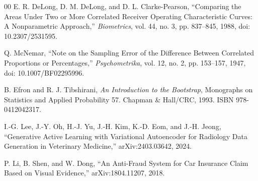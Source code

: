 \documentclass[journal]{IEEEtran}
\begin{document}
\begin{thebibliography}{00}
E. R. DeLong, D. M. DeLong, and D. L. Clarke-Pearson,
``Comparing the Areas Under Two or More Correlated Receiver Operating Characteristic Curves: A Nonparametric Approach,''
\textit{Biometrics}, vol. 44, no. 3, pp. 837--845, 1988,
doi: 10.2307/2531595.

Q. McNemar,
``Note on the Sampling Error of the Difference Between Correlated Proportions or Percentages,''
\textit{Psychometrika}, vol. 12, no. 2, pp. 153--157, 1947,
doi: 10.1007/BF02295996.

B. Efron and R. J. Tibshirani,
\textit{An Introduction to the Bootstrap}, Monographs on Statistics and Applied Probability 57.
Chapman \& Hall/CRC, 1993. ISBN 978-0412042317.

I.-G. Lee, J.-Y. Oh, H.-J. Yu, J.-H. Kim, K.-D. Eom, and J.-H. Jeong,
``Generative Active Learning with Variational Autoencoder for Radiology Data Generation in Veterinary Medicine,''
arXiv:2403.03642, 2024.

P. Li, B. Shen, and W. Dong,
``An Anti-Fraud System for Car Insurance Claim Based on Visual Evidence,''
arXiv:1804.11207, 2018.

\end{thebibliography}
\end{document}

